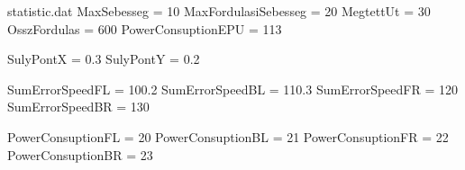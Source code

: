 \begin{filecontents}{statistic.dat}
MaxSebesseg = 10
MaxFordulasiSebesseg = 20
MegtettUt = 30
OsszFordulas = 600
PowerConsuptionEPU = 113

SulyPontX = 0.3
SulyPontY = 0.2

SumErrorSpeedFL = 100.2
SumErrorSpeedBL = 110.3
SumErrorSpeedFR = 120
SumErrorSpeedBR = 130

PowerConsuptionFL = 20
PowerConsuptionBL = 21
PowerConsuptionFR = 22
PowerConsuptionBR = 23

\end{filecontents}